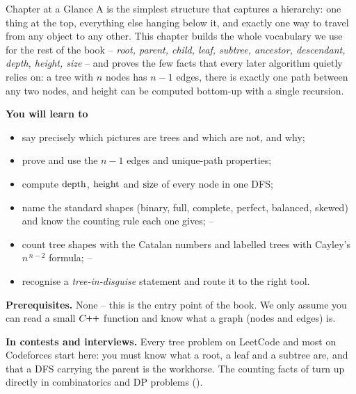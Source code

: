 
\begin{chaptertheorybox}{Chapter at a Glance}
A  is the simplest structure that captures a hierarchy: one thing at the
top, everything else hanging below it, and exactly one way to travel from any object
to any other. This chapter builds the whole vocabulary we use for the rest of the
book -- \emph{root, parent, child, leaf, subtree, ancestor, descendant, depth,
height, size} -- and proves the few facts that every later algorithm quietly relies
on: a tree with $n$ nodes has $n-1$ edges, there is exactly one path between any two
nodes, and height can be computed bottom-up with a single recursion.

\textbf{You will learn to}
\begin{itemize}[nosep]
  \item say precisely which pictures are trees and which are not, and why;      \hfill{}
  \item prove and use the $n-1$ edges and unique-path properties;               \hfill{}
  \item compute $\operatorname{depth}$, $\operatorname{height}$ and $\operatorname{size}$ of every node in one DFS;        \hfill{}
  \item name the standard shapes (binary, full, complete, perfect, balanced, skewed)
        and know the counting rule each one gives;                    \hfill{}--
  \item count tree shapes with the Catalan numbers and labelled trees with Cayley's
        $n^{\,n-2}$ formula;                                                    \hfill{}--
  \item recognise a \emph{tree-in-disguise} statement and route it to the right tool. \hfill{}
\end{itemize}

\textbf{Prerequisites.} None -- this is the entry point of the book. We only assume
you can read a small $\cpp$ function and know what a graph (nodes and edges) is.

\textbf{In contests and interviews.} Every tree problem on LeetCode and most on
Codeforces start here: you must know what a root, a leaf and a subtree are, and that
a DFS carrying the parent is the workhorse. The counting facts of 
turn up directly in combinatorics and DP problems ().
\end{chaptertheorybox}

